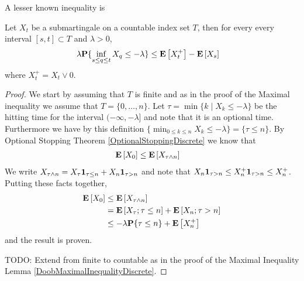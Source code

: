 A lesser known inequality is
\begin{lem}\label{DoobMinimalInequalityDiscrete}Let $X_t$ be a
  submartingale on a countable index set $T$, then for every every
  interval $[s,t] \subset T$ and $\lambda > 0$, 
\begin{align*}
\lambda \textbf{P}\{\inf_{s \leq q \leq t} X_q \leq -\lambda\} &\leq
\textbf{E}\left[X_t^+\right] - \textbf{E}\left[X_s\right]
\end{align*}
where $X_t^+ = X_t \vee 0$.
\end{lem}
\begin{proof}
We start by assuming that $T$ is finite and as in the proof of the
Maximal inequality we assume that $T = \lbrace 0, \dots, n \rbrace$.
Let $\tau = \min \lbrace k \mid X_k \leq -\lambda \rbrace$ be the
hitting time for the interval $(-\infty, -\lambda]$ and note that it
is an optional time.  Furthermore we have by this definition $\lbrace \min_{0
  \leq k \leq n} X_k \leq -\lambda \rbrace=\lbrace \tau \leq n\rbrace$.  By
Optional Stopping Theorem \ref{OptionalStoppingDiscrete} we know that 
\begin{align*}
\textbf{E}\left[X_0\right] &\leq \textbf{E}\left[X_{\tau \wedge n}\right]
\end{align*}
We write $X_{\tau \wedge n} = X_\tau \textbf{1}_{\tau \leq n}
+ X_n \textbf{1}_{\tau > n}$ and note that $ X_n \textbf{1}_{\tau
  > n} \leq  X_n^+ \textbf{1}_{\tau > n} \leq X_n^+$.  Putting
these facts together,
\begin{align*}
\textbf{E}\left[X_0\right] &\leq \textbf{E}\left[X_{\tau \wedge n}\right] \\
&=\textbf{E}\left[X_{\tau} ; \tau \leq n\right] + \textbf{E}\left[X_n ; \tau > n\right]
\\
&\leq -\lambda \textbf{P}\{\tau \leq n\} + \textbf{E}\left[X_n^+\right] 
\end{align*}
and the result is proven.

TODO: Extend from finite to countable as in the proof of the Maximal
Inequality Lemma \ref{DoobMaximalInequalityDiscrete}.
\end{proof}
 
